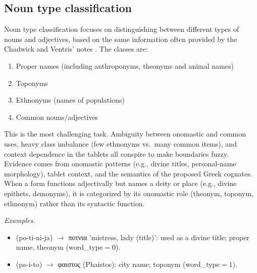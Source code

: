 \subsection{Noun type classification}
Noun type classification focuses on distinguishing between different types of nouns and adjectives, based on the same information often provided by the Chadwick and Ventris' notes \cite{chadwick-notes}. The classes are:
\begin{enumerate}[start=0]
    \item Proper names (including anthroponyms, theonyms and animal names)
    \item Toponyms
    \item Ethnonyms (names of populations)
    \item Common nouns/adjectives
\end{enumerate}
This is the most challenging task.
Ambiguity between onomastic and common uses, heavy class imbalance (few ethnonyms vs.\ many common items), and context dependence in the tablets all conspire to make boundaries fuzzy.
Evidence comes from onomastic patterns (e.g., divine titles, personal-name morphology), tablet context, and the semantics of the proposed Greek cognates.
When a form functions adjectivally but names a deity or place (e.g., divine epithets, demonyms), it is categorized by its onomastic role (theonym, toponym, ethnonym) rather than its syntactic function.

\textit{Examples.}
\begin{itemize}
  \item \textlinb{\Bpo\Bti\Bni\Bja}(po-ti-ni-ja) $\rightarrow$ \textgreek{ποτνια} 'mistress, lady (title)': used as a divine title; proper name, theonym (word\_type$=0$).
  \item \textlinb{\Bpa\Bi\Bto}(pa-i-to) $\rightarrow$ \textgreek{φαιστος} (Phaistos): city name; toponym (word\_type$=1$).
\end{itemize}

